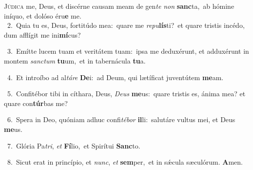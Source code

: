 \lettrine{\initial\textcolor{\initialcolor}{J}}{údica} me, Deus, et discérne causam meam de gen\textit{te} \textit{non} \textbf{sanc}\-ta,~\star ab hómine iníquo, et dolóso éru\textbf{e} me.\\
{\numbfont\textcolor{\numbcolor}{~2.}}~Quia tu es, Deus, fortitúdo mea:~\dagger quare me \textit{re}\-\textit{pu}\textbf{lís}ti?~\star et quare tristis incédo, dum afflígit me ini\-\textbf{mí}\-cus?\par
{\numbfont\textcolor{\numbcolor}{~3.}}~Emítte lucem tuam et veritátem tuam:~\dagger ipsa me deduxérunt, et adduxérunt in montem \textit{sanc}\-\textit{tum} \textbf{tu}\-um,~\star et in tabernácula \textbf{tu}\-a.\par
{\numbfont\textcolor{\numbcolor}{~4.}}~Et introíbo ad al\-\textit{tá}\-\textit{re} \textbf{De}\-i:~\star ad Deum, qui lætíficat juventútem \textbf{me}\-am.\par
{\numbfont\textcolor{\numbcolor}{~5.}}~Confitébor tibi in cíthara, Deus, \textit{De}\-\textit{us} \textbf{me}\-us:~\star quare tristis es, ánima mea? et quare con\-\textbf{túr}\-bas me?\par
{\numbfont\textcolor{\numbcolor}{~6.}}~Spera in Deo, quóniam adhuc confi\-\textit{té}\-\textit{bor} \textbf{il}\-li:~\star salutáre vultus mei, et Deus \textbf{me}\-us.\par
{\numbfont\textcolor{\numbcolor}{~7.}}~Glória Pa\-\textit{tri}\-, \textit{et} \textbf{Fí}\-lio,~\star et Spirítui \textbf{Sanc}\-to.\par
{\numbfont\textcolor{\numbcolor}{~8.}}~Sicut erat in princípio, et \textit{nunc}\-, \textit{et} \textbf{sem}\-per,~\star et in sǽcula sæculórum. \textbf{A}\-men.\par
